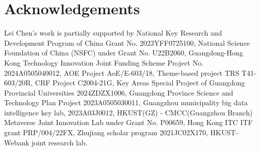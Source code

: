 \documentclass[sigconf]{acmart}
\begin{document}
\maketitle
\vfill\eject





\section{Acknowledgements}
Lei Chen’s work is partially supported by National Key Research and Development Program of China Grant No. 2023YFF0725100, National Science Foundation of China (NSFC) under Grant No. U22B2060, Guangdong-Hong Kong Technology Innovation Joint Funding Scheme Project No. 2024A0505040012, AOE Project AoE/E-603/18, Theme-based project TRS T41-603/20R, CRF Project C2004-21G, Key Areas Special Project of Guangdong Provincial Universities 2024ZDZX1006,  Guangdong Province Science and Technology Plan Project 2023A0505030011, Guangzhou municipality big data intelligence key lab, 2023A03J0012, HKUST(GZ) - CMCC(Guangzhou Branch) Metaverse Joint Innovation Lab under Grant No. P00659, Hong Kong ITC ITF grant PRP/004/22FX, Zhujiang scholar program 2021JC02X170, HKUST-Webank joint research lab.
\clearpage


\balance

\clearpage
\appendix

\end{document}
